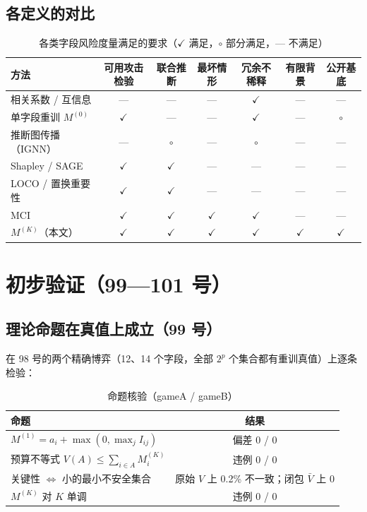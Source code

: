 \documentclass[zihao=-4,a4paper]{ctexart}
\newcommand{\M}{M^{(K)}}
\begin{document}
\subsection{各定义的对比}

\begin{table}[H]\centering
\caption{各类字段风险度量满足的要求（$\checkmark$ 满足，$\circ$ 部分满足，— 不满足）}
\footnotesize\setlength{\tabcolsep}{4pt}
\begin{tabular}{lcccccc}
\toprule
方法 & 可用攻击检验 & 联合推断 & 最坏情形 & 冗余不稀释 & 有限背景 & 公开基底 \\
\midrule
相关系数 / 互信息 & — & — & — & $\checkmark$ & — & — \\
单字段重训 $M^{(0)}$ & $\checkmark$ & — & — & $\checkmark$ & — & $\circ$ \\
推断图传播（IGNN） & — & $\circ$ & — & $\circ$ & — & — \\
Shapley / SAGE & $\checkmark$ & $\checkmark$ & — & — & — & — \\
LOCO / 置换重要性 & $\checkmark$ & $\checkmark$ & — & — & — & — \\
MCI & $\checkmark$ & $\checkmark$ & $\checkmark$ & $\checkmark$ & — & — \\
$\M$（本文） & $\checkmark$ & $\checkmark$ & $\checkmark$ & $\checkmark$ & $\checkmark$ & $\checkmark$ \\
\bottomrule
\end{tabular}
\end{table}

\section{初步验证（99—101 号）}

\subsection{理论命题在真值上成立（99 号）}

在 98 号的两个精确博弈（12、14 个字段，全部 $2^{p}$ 个集合都有重训真值）上逐条检验：

\begin{table}[H]\centering
\caption{命题核验（gameA / gameB）}
\begin{tabular}{lc}
\toprule
命题 & 结果 \\
\midrule
$M^{(1)}=a_i+\max(0,\max_j I_{ij})$ & 偏差 0 / 0 \\
预算不等式 $V(A)\le\sum_{i\in A}M^{(K)}_i$ & 违例 0 / 0 \\
关键性 $\Leftrightarrow$ 小的最小不安全集合 & 原始 $V$ 上 0.2\% 不一致；闭包 $\bar V$ 上 0 \\
$M^{(K)}$ 对 $K$ 单调 & 违例 0 / 0 \\
\bottomrule
\end{tabular}
\end{table}
\end{document}
